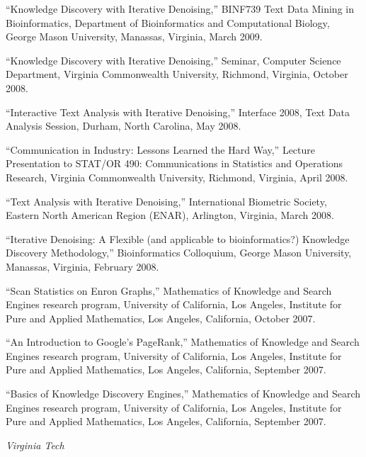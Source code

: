 \documentclass[11pt,article,oneside]{memoir}
\begin{document}
\ind “Knowledge Discovery with Iterative Denoising,” BINF739 Text Data Mining in Bioinformatics, Department of Bioinformatics and Computational Biology, George Mason University, Manassas, Virginia, March 2009.

\ind “Knowledge Discovery with Iterative Denoising,” Seminar, Computer Science Department, Virginia Commonwealth University, Richmond, Virginia, October 2008.

\ind “Interactive Text Analysis with Iterative Denoising,” Interface 2008, Text Data Analysis Session, Durham, North Carolina, May 2008.

\ind “Communication in Industry: Lessons Learned the Hard Way,” Lecture Presentation to STAT/OR 490: Communications in Statistics and Operations Research, Virginia Commonwealth University, Richmond, Virginia, April 2008.

\ind “Text Analysis with Iterative Denoising,” International Biometric Society, Eastern North American Region (ENAR), Arlington, Virginia, March 2008.

\ind “Iterative Denoising: A Flexible (and applicable to bioinformatics?) Knowledge Discovery Methodology,” Bioinformatics Colloquium, George Mason University, Manassas, Virginia, February 2008.

\ind “Scan Statistics on Enron Graphs,” Mathematics of Knowledge and Search Engines research program, University of California, Los Angeles, Institute for Pure and Applied Mathematics, Los Angeles, California, October 2007.

\ind “An Introduction to Google’s PageRank,” Mathematics of Knowledge and Search Engines research program, University of California, Los Angeles, Institute for Pure and Applied Mathematics, Los Angeles, California, September 2007.

\ind “Basics of Knowledge Discovery Engines,” Mathematics of Knowledge and Search Engines research program, University of California, Los Angeles, Institute for Pure and Applied Mathematics, Los Angeles, California, September 2007.


 


\newpage


\noindent\emph{Virginia Tech \vspace{0.05in}}
\end{document}
